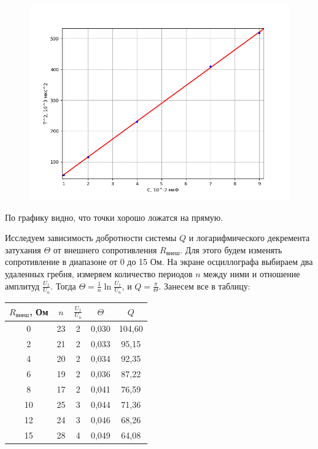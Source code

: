 \documentclass[a4paper,12pt]{article} %
\begin{document}
\begin{figure}[h!]
	\centering
	\includegraphics[scale=0.85]{Pictures/T^2(C).png}
\end{figure}

По графику видно, что точки хорошо ложатся на прямую.
\vspace{7mm}

Исследуем зависимость добротности системы $Q$ и логарифмического декремента затухания $\Theta$ от внешнего сопротивления $R_{\text{внеш}}$. Для этого будем изменять сопротивление в диапазоне от 0 до 15 Ом. На экране осциллографа выбираем два удаленных гребня, измеряем количество периодов $n$ между ними и отношение амплитуд $\frac{U_1}{U_n}$. Тогда $\Theta = \frac{1}{n}\ln\frac{U_1}{U_n}$, и $Q = \frac{\pi}{\Theta}$. Занесем все в таблицу:

\begin{table}[h!]
	\centering
	\begin{tabular}{|c|c|c|c|c|}
		\hline
		$R_{\text{внеш}}$, Ом & $n$ & $\frac{U_1}{U_n}$ & $\Theta$ & $Q$      \\ \hline
		0                     & 23  & 2                 & 0,030    & 104,60 \\ \hline
		2                     & 21  & 2                 & 0,033    & 95,15  \\ \hline
		4                     & 20  & 2                 & 0,034    & 92,35  \\ \hline
		6                     & 19  & 2                 & 0,036    & 87,22  \\ \hline
		8                     & 17  & 2                 & 0,041    & 76,59  \\ \hline
		10                    & 25  & 3                 & 0,044    & 71,36  \\ \hline
		12                    & 24  & 3                 & 0,046    & 68,26  \\ \hline
		15                    & 28  & 4                 & 0,049    & 64,08  \\ \hline
	\end{tabular}
\end{table}
\end{document}
